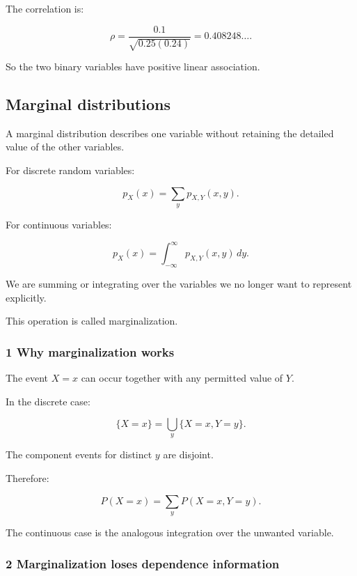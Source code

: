 The correlation is:

\[
 \rho= \frac{0.1}{\sqrt{0.25(0.24)}} =\boxed{0.408248\ldots}.
\]

So the two binary variables have positive linear association.

\subsection{Marginal distributions}\label{02-foundations-ii-ch023-marginal-distributions}

\hypertarget{02-foundations-ii-ch023-marginal-distributions}{}

A marginal distribution describes one variable without retaining the detailed value of the other variables.

For discrete random variables:

\[
 \boxed{ p_X(x)=\sum_yp_{X,Y}(x,y) }.
\]

For continuous variables:

\[
 \boxed{ p_X(x)= \int_{-\infty}^{\infty} p_{X,Y}(x,y)\,dy }.
\]

We are summing or integrating over the variables we no longer want to represent explicitly.

This operation is called marginalization.

\subsubsection{1 Why marginalization works}\label{02-foundations-ii-ch023-why-marginalization-works}

\hypertarget{02-foundations-ii-ch023-why-marginalization-works}{}

The event \(X=x\) can occur together with any permitted value of \(Y\).

In the discrete case:

\[
 \{X=x\} = \bigcup_y\{X=x,Y=y\}.
\]

The component events for distinct \(y\) are disjoint.

Therefore:

\[
 P(X=x)=\sum_yP(X=x,Y=y).
\]

The continuous case is the analogous integration over the unwanted variable.

\subsubsection{2 Marginalization loses dependence information}\label{02-foundations-ii-ch023-marginalization-loses-dependence-information}

